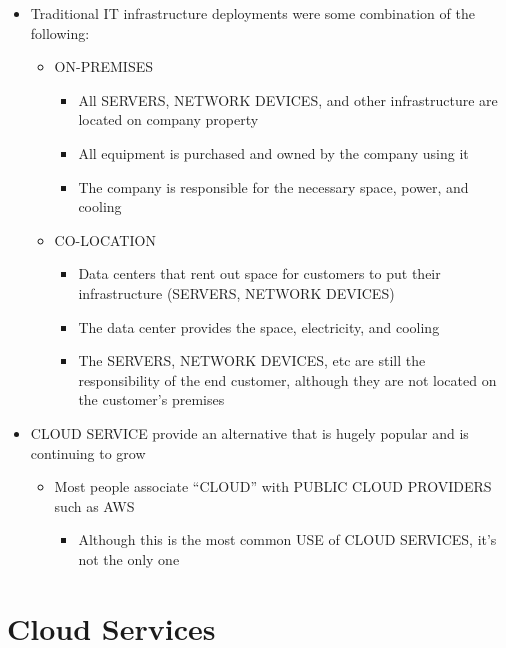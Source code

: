 \begin{itemize}
\tightlist
\item
  Traditional IT infrastructure deployments were some combination of the
  following:

  \begin{itemize}
  \tightlist
  \item
    ON-PREMISES

    \begin{itemize}
    \tightlist
    \item
      All SERVERS, NETWORK DEVICES, and other infrastructure are located
      on company property
    \item
      All equipment is purchased and owned by the company using it
    \item
      The company is responsible for the necessary space, power, and
      cooling
    \end{itemize}
  \item
    CO-LOCATION

    \begin{itemize}
    \tightlist
    \item
      Data centers that rent out space for customers to put their
      infrastructure (SERVERS, NETWORK DEVICES)
    \item
      The data center provides the space, electricity, and cooling
    \item
      The SERVERS, NETWORK DEVICES, etc are still the responsibility of
      the end customer, although they are not located on the customer's
      premises
    \end{itemize}
  \end{itemize}
\item
  CLOUD SERVICE provide an alternative that is hugely popular and is
  continuing to grow

  \begin{itemize}
  \tightlist
  \item
    Most people associate ``CLOUD'' with PUBLIC CLOUD PROVIDERS such as
    AWS

    \begin{itemize}
    \tightlist
    \item
      Although this is the most common USE of CLOUD SERVICES, it's not
      the only one
    \end{itemize}
  \end{itemize}
\end{itemize}

\section{Cloud Services}\label{cloud-services}

